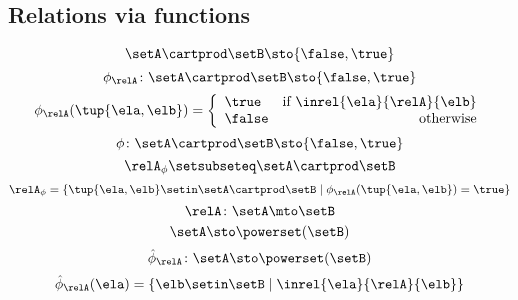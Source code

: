 \begin{forslides}
\subsection{Relations via functions}

\begin{equation}\label{eq:slides_session2_rel_110}
\setA \cartprod \setB \sto \{ \false, \true \}
\end{equation}
 \begin{equation}\label{eq:slides_session2_rel_111}
\phi_{\relA} \colon \setA \cartprod \setB \sto \{ \false, \true \}
\end{equation}
\begin{equation}\label{eq:slides_session2_rel_112}
\phi_{\relA}(\tup{\ela, \elb}) =
              \left
              \{\begin{array}{lr}
                  \true  & \text{if } \inrel{\ela}{\relA}{\elb} \\
                  \false & \text{otherwise} 
              \end{array}
              \right.
\end{equation}
 \begin{equation}\label{eq:slides_session2_rel_113}
\phi\colon \setA \cartprod \setB \sto \{ \false, \true \}
\end{equation}
\begin{equation}\label{eq:slides_session2_rel_114}
\relA_{\phi} \setsubseteq \setA \cartprod \setB
\end{equation}
 \begin{equation}\label{eq:slides_session2_rel_115}
\relA_{\phi} = \{ \tup{\ela, \elb} \setin \setA \cartprod \setB \mid \phi_{\relA}(\tup{\ela, \elb}) = \true \}
\end{equation}
\begin{equation}\label{eq:slides_session2_rel_116}
\relA \colon \setA \mto \setB
\end{equation}
 \begin{equation}\label{eq:slides_session2_rel_117}
\setA  \sto \powerset (\setB)
\end{equation}
\begin{equation}\label{eq:slides_session2_rel_118}
\hat \phi_{\relA} \colon \setA \sto \powerset (\setB)
\end{equation}
 \begin{equation}\label{eq:slides_session2_rel_119}
\hat \phi_{\relA} (\ela) = \{ \elb \setin \setB \mid \inrel{\ela}{\relA}{\elb}\}
\end{equation}
\begin{equation}\label{eq:slides_session2_rel_120}

\end{equation}
\end{forslides}
